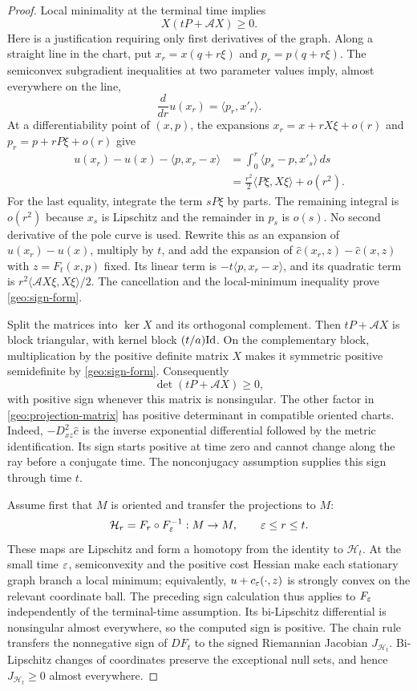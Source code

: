 \begin{proof}
Local minimality at the terminal time implies
\begin{equation}
 \label{geo:sign-form}
 X(tP+\mathscr A X)\geq0.
\end{equation}
Here is a justification requiring only first derivatives of the graph.
Along a straight line in the chart, put
$x_r=x(q+r\xi)$ and $p_r=p(q+r\xi)$.  The semiconvex
subgradient inequalities at two parameter values imply, almost
everywhere on the line,
\[
 \frac{d}{dr}u(x_r)=\langle p_r,x'_r\rangle.
\]
At a differentiability point of $(x,p)$, the expansions
$x_r=x+rX\xi+o(r)$ and $p_r=p+rP\xi+o(r)$ give
\[
 \begin{split}
 u(x_r)-u(x)-\langle p,x_r-x\rangle
 &=\int_0^r\langle p_s-p,x'_s\rangle\,ds\\
 &=\frac{r^2}{2}\langle P\xi,X\xi\rangle+o(r^2).
 \end{split}
\]
For the last equality, integrate the term $sP\xi$ by parts.
The remaining integral is $o(r^2)$ because $x_s$ is Lipschitz and
the remainder in $p_s$ is $o(s)$.  No second derivative of the pole
curve is used.
Rewrite this as an expansion of $u(x_r)-u(x)$, multiply by $t$,
and add the expansion of
$\hat c(x_r,z)-\hat c(x,z)$ with $z=F_t(x,p)$ fixed.
Its linear term is $-t\langle p,x_r-x\rangle$, and its
quadratic term is $r^2\langle\mathscr A X\xi,X\xi\rangle/2$.
The cancellation and the local-minimum inequality prove
\eqref{geo:sign-form}.

Split the matrices into $\ker X$ and its orthogonal complement.
Then $tP+\mathscr A X$ is block triangular, with kernel block
$(t/a)\mathrm{Id}$.  On the complementary block, multiplication by the
positive definite matrix $X$ makes it symmetric positive semidefinite
by \eqref{geo:sign-form}.  Consequently
\[
 \det(tP+\mathscr A X)\geq0,
\]
with positive sign whenever this matrix is nonsingular.
The other factor in \eqref{geo:projection-matrix} has positive
determinant in compatible oriented charts.  Indeed,
$-D^2_{xz}\hat c$ is the inverse exponential differential followed
by the metric identification.  Its sign starts positive at time zero
and cannot change along the ray before a conjugate time.  The
nonconjugacy assumption supplies this sign through time $t$.

Assume first that $M$ is oriented and transfer the projections to $M$:
\[
 \mathcal H_r=F_r\circ F_\varepsilon^{-1}:M\to M,
 \qquad \varepsilon\leq r\leq t.
\]
These maps are Lipschitz and form a homotopy from the identity to
$\mathcal H_t$.  At the small time $\varepsilon$, semiconvexity and the
positive cost Hessian make each stationary graph branch a local
minimum; equivalently, $u+c_\varepsilon(\cdot,z)$ is strongly convex on
the relevant coordinate ball.  The preceding sign calculation thus
applies to $F_\varepsilon$ independently of the terminal-time assumption.
Its bi-Lipschitz differential is nonsingular almost everywhere, so
the computed sign is positive.  The chain rule transfers the
nonnegative sign of $DF_t$ to the signed Riemannian Jacobian
$J_{\mathcal H_t}$.  Bi-Lipschitz changes of coordinates preserve
the exceptional null sets, and hence
$J_{\mathcal H_t}\geq0$ almost everywhere.


\end{proof}
